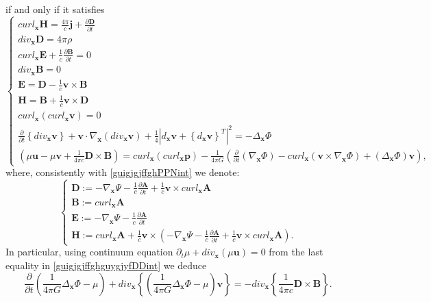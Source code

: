 \documentclass{article}
\theoremstyle{definition}
\theoremstyle{remark}
\renewcommand{\vec}[1]{\mathbf{#1}}
\newcommand{\er}{\eqref}
\newcommand{\er}{\eqref}
\begin{document}
if and only if it satisfies
\begin{equation}\label{guigjgjffghguygjyfDDint}
\begin{cases}
curl_{\vec x}\vec H=\frac{4\pi}{c}\vec j+\frac{\partial\vec
D}{\partial
t}\\
div_{\vec x}\vec D=4\pi\rho\\
curl_{\vec x}\vec E+\frac{1}{c}\frac{\partial\vec B}{\partial t}=0\\
div_{\vec x}\vec B=0\\
\vec E=\vec D-\frac{1}{c}\vec v\times\vec B\\
\vec H=\vec B+\frac{1}{c}\vec v\times\vec D\\
curl_{\vec x}\left(curl_{\vec x}\vec v\right)=0
\\
\frac{\partial}{\partial t}\left\{div_{\vec x}\vec v\right\}+\vec
v\cdot\nabla_{\vec x}\left(div_{\vec x}\vec
v\right)+\frac{1}{4}\left|d_{\vec x}\vec v+\left\{d_{\vec x}\vec
v\right\}^T\right|^2=-\Delta_{\vec x}\Phi\\
\left(\mu\vec u-\mu\vec v+\frac{1}{4\pi c}\vec D\times\vec
B\right)=curl_{\vec x}\left(curl_{\vec x}\vec p\right)-\frac{1}{4\pi
G}\left(\frac{\partial}{\partial t}\left(\nabla_{\vec
x}\Phi\right)-curl_{\vec x}\left(\vec v\times\nabla_{\vec
x}\Phi\right)+\left(\Delta_{\vec x}\Phi\right)\vec v\right),
\end{cases}
\end{equation}
where, consistently with \er{guigjgjffghPPNint} we denote:
\begin{equation}\label{guigjgjffghDDint}
\begin{cases}
\vec D:=-\nabla_{\vec x}\Psi-\frac{1}{c}\frac{\partial\vec
A}{\partial t}+\frac{1}{c}\vec
v\times curl_{\vec x}\vec A\\
\vec B:=curl_{\vec x}\vec A
\\
\vec E:=-\nabla_{\vec x}\Psi-\frac{1}{c}\frac{\partial\vec A}{\partial t}\\
\vec H:=curl_{\vec x}\vec A+\frac{1}{c}\vec
v\times\left(-\nabla_{\vec x}\Psi-\frac{1}{c}\frac{\partial\vec
A}{\partial t}+\frac{1}{c}\vec v\times curl_{\vec x}\vec A\right).
\end{cases}
\end{equation}
In particular, using continuum equation $\partial_t\mu+div_{\vec
x}\left(\mu\vec u\right)=0$ from the last equality in
\er{guigjgjffghguygjyfDDint} we deduce
\begin{equation*}
\frac{\partial}{\partial t}\left(\frac{1}{4\pi G}\Delta_{\vec
x}\Phi-\mu\right)+div_{\vec x}\left\{\left(\frac{1}{4\pi
G}\Delta_{\vec x}\Phi-\mu\right)\vec v\right\}=-div_{\vec
x}\left\{\frac{1}{4\pi c}\vec D\times\vec B\right\}.
\end{equation*}
\end{document}
